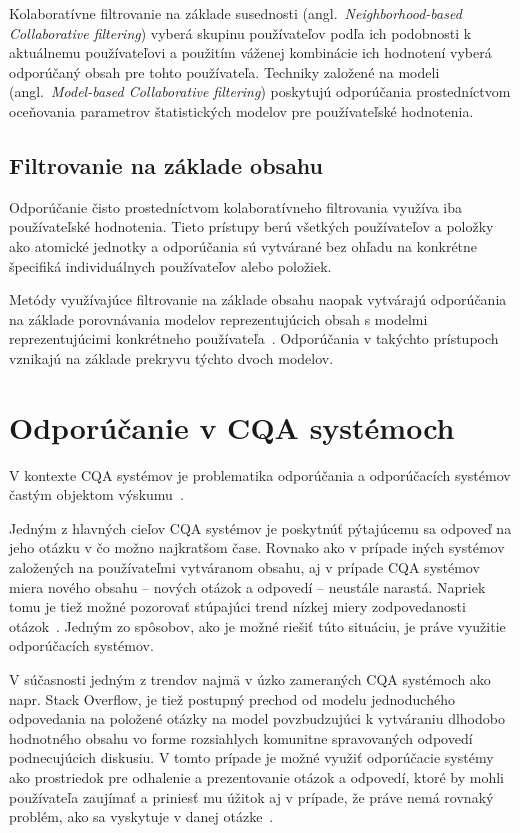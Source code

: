 Kolaboratívne filtrovanie na základe susednosti (angl.~\emph{Neighborhood-based Collaborative filtering})
vyberá skupinu používateľov podľa ich podobnosti k aktuálnemu používateľovi
a použitím váženej kombinácie ich hodnotení vyberá odporúčaný obsah pre tohto používateľa.
Techniky založené na modeli (angl.~\emph{Model-based Collaborative filtering}) poskytujú odporúčania prostedníctvom
oceňovania parametrov štatistických modelov pre používateľské hodnotenia.

\subsection{Filtrovanie na základe obsahu}\label{rec:content}

Odporúčanie čisto prostedníctvom kolaboratívneho filtrovania využíva iba používateľské hodnotenia. Tieto prístupy berú
všetkých používateľov a položky ako atomické jednotky a odporúčania sú vytvárané bez ohľadu na konkrétne špecifiká
individuálnych používateľov alebo položiek.

Metódy využívajúce filtrovanie na základe obsahu naopak vytvárajú
odporúčania na základe porovnávania modelov reprezentujúcich obsah s modelmi reprezentujúcimi konkrétneho používateľa~\cite{Handbook2011}.
Odporúčania v takýchto prístupoch vznikajú na základe prekryvu týchto dvoch modelov.


\section{Odporúčanie v CQA systémoch}

V kontexte CQA systémov je problematika odporúčania a odporúčacích systémov častým objektom výskumu~\cite{Srba2016}.

Jedným z hlavných cieľov CQA systémov je poskytnúť pýtajúcemu sa odpoveď na jeho otázku v čo možno najkratšom čase.
Rovnako ako v prípade iných systémov založených na používateľmi vytváranom obsahu, aj v prípade CQA systémov miera
nového obsahu -- nových otázok a odpovedí -- neustále narastá. Napriek tomu je tiež možné pozorovať stúpajúci trend
nízkej miery zodpovedanosti otázok~\cite{Srba2016SOFail}. Jedným zo spôsobov, ako je možné riešiť túto situáciu,
je práve využitie odporúčacích systémov.

V súčasnosti jedným z trendov najmä v úzko zameraných CQA systémoch ako napr. Stack Overflow, je tiež postupný prechod
od modelu jednoduchého odpovedania na položené otázky na model povzbudzujúci k vytváraniu dlhodobo hodnotného obsahu
vo forme rozsiahlych komunitne spravovaných odpovedí~\cite{Anderson2012,Li2015} podnecujúcich diskusiu.
V tomto prípade je možné využiť odporúčacie systémy ako prostriedok pre odhalenie a prezentovanie otázok a odpovedí,
ktoré by mohli používateľa zaujímať a priniesť mu úžitok aj v prípade, že práve nemá rovnaký problém,
ako sa vyskytuje v danej otázke~\cite{Toba2014}.

